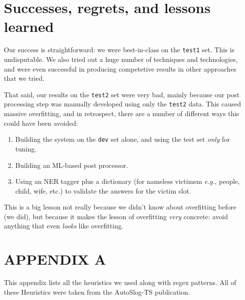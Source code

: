 \documentclass[11pt]{myclass}
\begin{document}
\section{Successes, regrets, and lessons learned}

Our success is straightforward: we were best-in-class on the \texttt{test1} set. This is undisputable. We also tried out a huge number of techniques and technologies, and were even successful in producing competetive results in other approaches that we tried.

That said, our results on the \texttt{test2} set were very bad, mainly because our post processing step was manually developed using only the \texttt{test2} data. This caused massive overfitting, and in retrospect, there are a number of different ways this could have been avoided:

\begin{enumerate}

\item Building the system on the \texttt{dev} set alone, and using the test set \textit{only} for tuning.
\item Building an ML-based post processor.
\item Using an NER tagger plus a dictionary (for nameless victimsm \textit{e.g.}, people, child, wife, etc.) to validate the answers for the victim slot.

\end{enumerate}


This is a big lesson not really because we didn't know about overfitting before (we did), but because it makes the lesson of overfitting \textit{very} concrete: avoid anything that even \textit{looks} like overfitting.













\section*{APPENDIX A}

This appendix lists all the heuristics we used along with regex patterns.  
All of these Heuristics were taken from the AutoSlog-TS publication.
\end{document}
